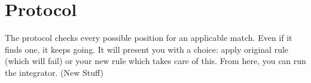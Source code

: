 \newpage
\section{Protocol}
\genHeader

The protocol checks every possible position for an applicable match. Even if it finds one,  it keeps going. It will present you with a choice: apply original
rule (which will fail) or your new rule which takes care of this. From here, you can run the integrator. (New Stuff)
